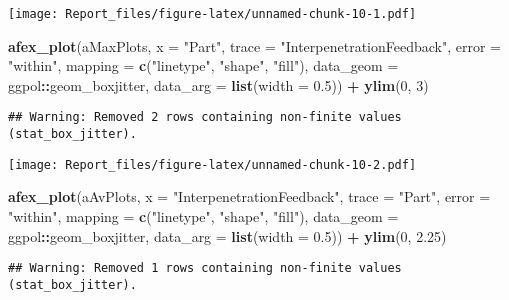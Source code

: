 \documentclass[
]{article}
\newenvironment{Shaded}{\begin{snugshade}}{\end{snugshade}}
\newcommand{\DataTypeTok}[1]{\textcolor[rgb]{0.13,0.29,0.53}{#1}}
\newcommand{\DecValTok}[1]{\textcolor[rgb]{0.00,0.00,0.81}{#1}}
\newcommand{\FloatTok}[1]{\textcolor[rgb]{0.00,0.00,0.81}{#1}}
\newcommand{\KeywordTok}[1]{\textcolor[rgb]{0.13,0.29,0.53}{\textbf{#1}}}
\newcommand{\NormalTok}[1]{#1}
\newcommand{\OperatorTok}[1]{\textcolor[rgb]{0.81,0.36,0.00}{\textbf{#1}}}
\newcommand{\StringTok}[1]{\textcolor[rgb]{0.31,0.60,0.02}{#1}}
\begin{document}
\texttt{[image: Report\_files/figure-latex/unnamed-chunk-10-1.pdf]}

\begin{Shaded}
\begin{Highlighting}[]
\KeywordTok{afex_plot}\NormalTok{(aMaxPlots, }\DataTypeTok{x =} \StringTok{"Part"}\NormalTok{, }\DataTypeTok{trace =} \StringTok{"InterpenetrationFeedback"}\NormalTok{, }\DataTypeTok{error =} \StringTok{"within"}\NormalTok{, }
                \DataTypeTok{mapping =} \KeywordTok{c}\NormalTok{(}\StringTok{"linetype"}\NormalTok{, }\StringTok{"shape"}\NormalTok{, }\StringTok{"fill"}\NormalTok{),}
                \DataTypeTok{data_geom =}\NormalTok{ ggpol}\OperatorTok{::}\NormalTok{geom_boxjitter, }
                \DataTypeTok{data_arg =} \KeywordTok{list}\NormalTok{(}\DataTypeTok{width =} \FloatTok{0.5}\NormalTok{))  }\OperatorTok{+}
\StringTok{            }\KeywordTok{ylim}\NormalTok{(}\DecValTok{0}\NormalTok{, }\DecValTok{3}\NormalTok{)}
\end{Highlighting}
\end{Shaded}

\begin{verbatim}
## Warning: Removed 2 rows containing non-finite values (stat_box_jitter).
\end{verbatim}

\texttt{[image: Report\_files/figure-latex/unnamed-chunk-10-2.pdf]}

\begin{Shaded}
\begin{Highlighting}[]
\KeywordTok{afex_plot}\NormalTok{(aAvPlots, }\DataTypeTok{x =} \StringTok{"InterpenetrationFeedback"}\NormalTok{,  }\DataTypeTok{trace =} \StringTok{"Part"}\NormalTok{, }\DataTypeTok{error =} \StringTok{"within"}\NormalTok{, }
                \DataTypeTok{mapping =} \KeywordTok{c}\NormalTok{(}\StringTok{"linetype"}\NormalTok{, }\StringTok{"shape"}\NormalTok{, }\StringTok{"fill"}\NormalTok{),}
                \DataTypeTok{data_geom =}\NormalTok{ ggpol}\OperatorTok{::}\NormalTok{geom_boxjitter, }
                \DataTypeTok{data_arg =} \KeywordTok{list}\NormalTok{(}\DataTypeTok{width =} \FloatTok{0.5}\NormalTok{)) }\OperatorTok{+}
\StringTok{            }\KeywordTok{ylim}\NormalTok{(}\DecValTok{0}\NormalTok{, }\FloatTok{2.25}\NormalTok{)}
\end{Highlighting}
\end{Shaded}

\begin{verbatim}
## Warning: Removed 1 rows containing non-finite values (stat_box_jitter).
\end{verbatim}
\end{document}
